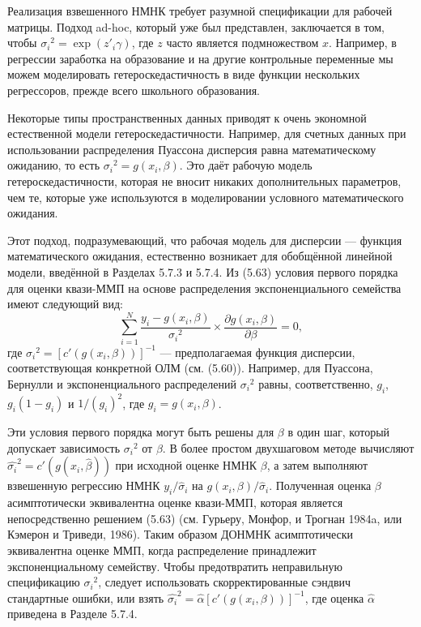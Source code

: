 Реализация взвешенного НМНК требует разумной спецификации для рабочей матрицы. Подход ad-hoc, который уже был представлен, заключается в том, чтобы ${\sigma_i}^{2}=\exp(z'_i\gamma)$, где $z$ часто является подмножеством $x$. Например, в регрессии заработка на образование и на другие контрольные переменные мы можем моделировать гетероскедастичность в виде функции нескольких регрессоров, прежде всего школьного образования.

Некоторые типы пространственных данных приводят к очень экономной естественной модели гетероскедастичности. Например, для счетных данных при использовании распределения Пуассона дисперсия равна математическому ожиданию, то есть ${\sigma_i}^{2}=g(x_i,\beta)$. Это даёт рабочую модель гетероскедастичности, которая не вносит никаких дополнительных параметров, чем те, которые уже используются в моделировании условного математического ожидания.

Этот подход, подразумевающий, что рабочая модель для дисперсии --- функция математического ожидания, естественно возникает для обобщённой линейной модели, введённой в Разделах 5.7.3 и 5.7.4. Из (5.63) условия первого порядка для оценки квази-ММП на основе распределения экспоненциального семейства имеют следующий вид:
\[
\sum_{i=1}^{N} \frac{y_i-g(x_i,\beta)}{{\sigma_i}^{2}} \times \frac{\partial g(x_i,\beta)}{\partial \beta}=0,
\]
где ${\sigma_i}^2=[c'(g(x_i,\beta))]^{-1}$ --- предполагаемая функция дисперсии, соответствующая конкретной ОЛМ (см. (5.60)). Например, для Пуассона, Бернулли и экспоненциального распределений ${\sigma_i}^2$ равны, соответственно, $g_i$, $g_i(1-g_i)$ и $1/(g_i)^2$, где $g_i=g(x_i,\beta)$.

Эти условия первого порядка могут быть решены для $\beta$ в один шаг, который допускает зависимость ${\sigma_i}^2$ от $\beta$. В более простом двухшаговом методе вычисляют $ \hat{\sigma_i}^2=c'(g(x_i,\hat{\beta}))$ при исходной оценке НМНК $\beta$, а затем выполняют взвешенную регрессию НМНК $y_i/\hat{\sigma}_i$ на $g(x_i,\beta)/\hat{\sigma}_i$. Полученная оценка $\beta$ асимптотически эквивалентна оценке квази-ММП, которая является непосредственно решением (5.63) (см. Гурьеру, Монфор, и Трогнан 1984a, или Кэмерон и Триведи, 1986). Таким образом ДОНМНК асимптотически эквивалентна оценке ММП, когда распределение принадлежит экспоненциальному семейству. Чтобы предотвратить неправильную спецификацию ${\sigma_i}^2$, следует использовать скорректированные сэндвич стандартные ошибки, или взять $\hat{\sigma_i}^2=\hat{\alpha}[c'(g(x_i,\beta))]^{-1}$, где оценка $\hat{\alpha}$ приведена в Разделе 5.7.4.

